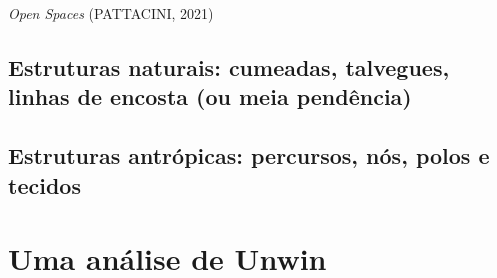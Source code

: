 \documentclass[]{report}
\begin{document}
	\textit{Open Spaces} (PATTACINI, 2021)
	
\section{Estruturas naturais: cumeadas, talvegues, linhas de encosta (ou meia pendência)}
\section{Estruturas antrópicas: percursos, nós, polos e tecidos}

\chapter{Uma análise de Unwin}
\end{document}
